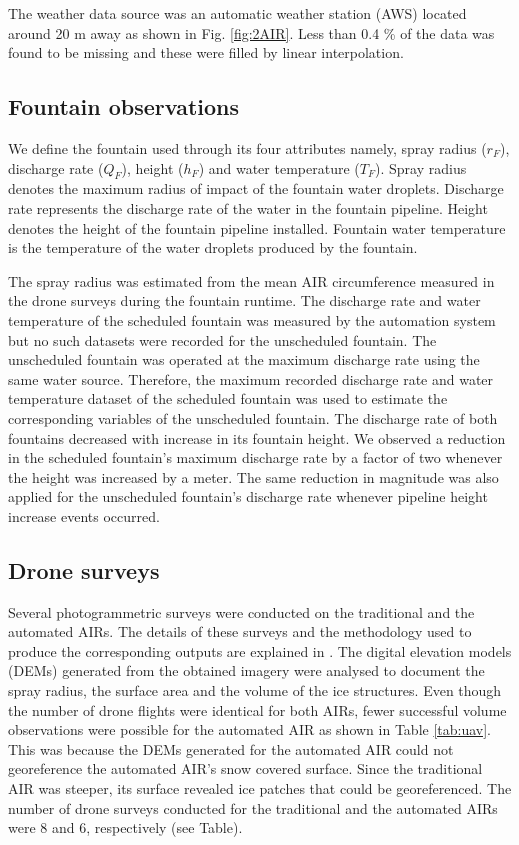 \documentclass[tc, manuscript]{copernicus}
\begin{document}
The weather data source was an automatic weather station (AWS) located around 20 m away as shown in Fig.
\ref{fig:2AIR}. Less than 0.4 \% of the data was found to be missing and these were filled by linear
interpolation. 

\subsection{Fountain observations}

We define the fountain used through its four attributes namely, spray radius ($r_F$), discharge rate ($Q_F$),
height ($h_F$) and water temperature ($T_F$). Spray radius denotes the maximum radius of impact of the fountain
water droplets. Discharge rate represents the discharge rate of the water in the fountain pipeline. Height
denotes the height of the fountain pipeline installed. Fountain water temperature is the temperature of the
water droplets produced by the fountain.

The spray radius was estimated from the mean AIR circumference measured in the drone surveys during the fountain
runtime. The discharge rate and water temperature of the scheduled fountain was measured by the automation
system but no such datasets were recorded for the unscheduled fountain. The unscheduled fountain was operated at
the maximum discharge rate using the same water source. Therefore, the maximum recorded discharge rate and water
temperature dataset of the scheduled fountain was used to estimate the corresponding variables of the
unscheduled fountain. The discharge rate of both fountains decreased with increase in its fountain height. We
observed a reduction in the scheduled fountain's maximum discharge rate by a factor of two whenever the height
was increased by a meter. The same reduction in magnitude was also applied for the unscheduled fountain's
discharge rate whenever pipeline height increase events occurred. 

\subsection{Drone surveys}

Several photogrammetric surveys were conducted on the traditional and the automated AIRs. The details of these
surveys and the methodology used to produce the corresponding outputs are explained in
\cite{balasubramanianInfluenceMeteorologicalConditions2022}. The digital elevation models (DEMs) generated from
the obtained imagery were analysed to document the spray radius, the surface area and the volume of the ice
structures. Even though the number of drone flights were identical for both AIRs, fewer successful volume
observations were possible for the automated AIR as shown in Table \ref{tab:uav}. This was because the DEMs
generated for the automated AIR could not georeference the automated AIR's snow covered surface. Since the
traditional AIR was steeper, its surface revealed ice patches that could be georeferenced. The number of drone
surveys conducted for the traditional and the automated AIRs were 8 and 6, respectively (see Table). 
\end{document}
